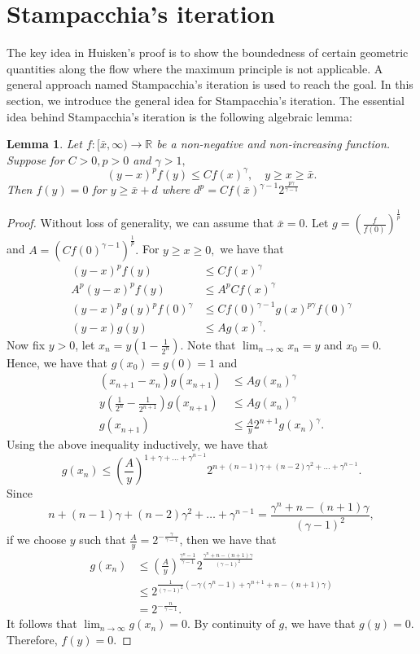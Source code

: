 \documentclass[a4paper]{report}
\newtheorem{lemma}{Lemma}
\newcommand{\R}{\mathbb{R}}
\theoremstyle{remark}
\begin{document}
\section{Stampacchia's iteration}
The key idea in Huisken's proof is to show the boundedness of certain geometric quantities along the flow where the maximum principle is not applicable. A general approach named Stampacchia's iteration is used to reach the goal. In this section, we introduce the general idea for Stampacchia's iteration.
The essential idea behind Stampacchia's iteration is the following algebraic lemma:
\begin{lemma}
	Let $f : [\bar{x},\infty) \to \R$ be a non-negative and non-increasing function. Suppose for $C>0, p>0$ and $\gamma >1,$ 
	\[ (y-x)^{p}f(y) \leq Cf(x)^{\gamma }, \quad y \geq x \geq \bar{x}.\] 
	Then $f(y)=0$ for $y \geq \bar{x} + d$ where $d^p=C f(\bar{x})^{\gamma -1}2^{\frac{p \gamma }{\gamma -1}}$ 
\end{lemma}
\begin{proof}
	Without loss of generality, we can assume that $\bar{x}=0.$ 
	Let $g=(\frac{f}{f(0)})^{\frac{1}{p}}$ and $A=(Cf(0)^{\gamma -1})^{\frac{1}{p}}.$ For $y \geq x \geq 0,$ we have that
	\begin{align*}
		(y-x)^{p}f(y) &\leq Cf(x)^{\gamma }\\
		A^p (y-x)^{p}f(y) &\leq A^p Cf(x)^{\gamma }\\
		(y-x)^p g(y)^p f(0)^{\gamma } &\leq C f(0)^{\gamma-1 }g(x)^{p \gamma } f(0)^{\gamma }\\
		(y-x)g(y) &\leq A g(x)^{\gamma }.
	\end{align*}
	Now fix $y>0$, let $x_n=y(1-\frac{1}{2^n})$. Note that $\lim_{n \to \infty} x_n=y$ and $x_0=0.$ Hence, we have that $g(x_0)=g(0)=1$ and 
	\begin{align*}
		(x_{n+1}-x_n)g(x_{n+1}) &\leq Ag(x_{n}^{} )^{\gamma }\\
		y(\frac{1}{2^{n}}-\frac{1}{2^{n+1}})g(x_{n+1}^{} ) &\leq Ag(x_{n}^{} )^{\gamma }\\
		g(x_{n+1}^{} ) &\leq \frac{A}{y}2^{n+1} g(x_{n}^{} )^{\gamma }.
	\end{align*} 
	Using the above inequality inductively, we have that \[g(x_{n}^{} ) \leq (\frac{A}{y})^{1+\gamma + \dots + \gamma ^{n-1}} 2^{n+(n-1)\gamma + (n-2)\gamma ^2 + \dots + \gamma ^{n-1}}.\]
	Since \[n+(n-1)\gamma + (n-2)\gamma ^2 + \dots + \gamma ^{n-1}=\frac{\gamma ^n+n-(n+1)\gamma }{(\gamma -1)^2},\]
	if we choose $y$ such that $\frac{A}{y}=2^{-\frac{\gamma }{\gamma -1}}$, then we have that 
	\begin{equation*}
	\begin{split}
		g(x_{n}^{} ) 
	&\leq  (\frac{A}{y})^{\frac{\gamma ^n-1}{\gamma -1}} 2^{\frac{\gamma ^n+n-(n+1)\gamma }{(\gamma -1)^2}} \\
	&\leq 2^{\frac{1}{(\gamma -1)^2}(-\gamma (\gamma ^n-1)+\gamma ^{n+1}+n-(n+1)\gamma )}\\
	&=2^{-\frac{n}{\gamma -1}}.
	\end{split}
	\end{equation*}
	It follows that $\lim_{n \to \infty} g(x_n)=0$. By continuity of $g$, we have that $g(y)=0.$ Therefore, $f(y)=0.$  
\end{proof}
\end{document}
